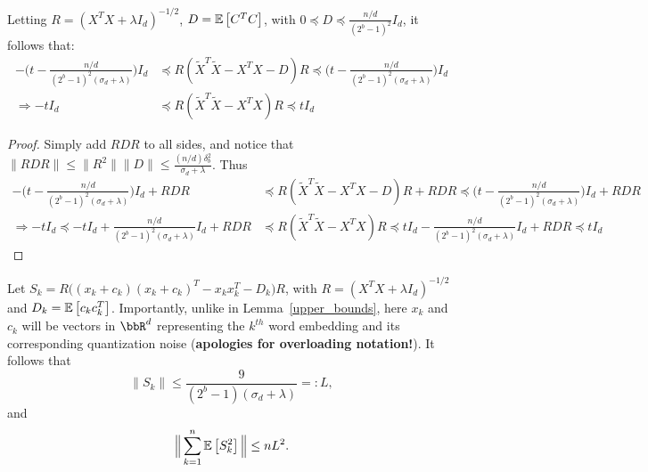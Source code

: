 \documentclass[12pt]{article}
\newcommand{\tX}{\tilde{X}}
\newcommand{\eqdef}{=:}
\begin{document}
	
\begin{lemma}
	\label{lem2}
	Letting $R = (X^T X + \lambda I_d)^{-1/2}$, $D = \expect{}{C^T C}$, with $0 \preceq D \preceq \frac{n/d}{(2^b-1)^2} I_d$, it follows that:
	\begin{align*}
	-\bigg(t - \frac{n/d}{(2^b-1)^2(\sigma_d + \lambda)}\bigg) I_d &\preceq R (\tX^T \tX - X^T X - D) R \preceq
	\bigg(t - \frac{n/d}{(2^b-1)^2(\sigma_d + \lambda)}\bigg) I_d \\
	\Longrightarrow -t I_d &\preceq R (\tX^T \tX - X^T X) R \preceq t I_d
	\end{align*}
\end{lemma}
\begin{proof}
	Simply add $RDR$ to all sides, and notice that $\|RDR\| \leq \|R^2\|\|D\| \leq  \frac{(n/d)\delta_b^2}{\sigma_d+\lambda}$. Thus
	\begin{align*}
-\bigg(t - \frac{n/d}{(2^b-1)^2(\sigma_d + \lambda)}\bigg) I_d + RDR &\preceq R (\tX^T \tX - X^T X - D) R + RDR \preceq
\bigg(t - \frac{n/d}{(2^b-1)^2(\sigma_d + \lambda)}\bigg) I_d +RDR \\
\Longrightarrow -t I_d \preceq -t I_d + \frac{n/d}{(2^b-1)^2(\sigma_d + \lambda)}I_d + RDR &\preceq R (\tX^T \tX - X^T X) R \preceq
t I_d - \frac{n/d}{(2^b-1)^2(\sigma_d + \lambda)} I_d + RDR \preceq t I_d
\end{align*}
\end{proof}
\begin{lemma}
	\label{upper_bounds2}
	Let $S_k = R\Big((x_k + c_k)(x_k + c_k)^T  - x_k x_k^T - D_k\Big)R$, with $R=(X^T X+\lambda I_d)^{-1/2}$ and $D_k = \expect{}{c_kc_k^T}$. Importantly, unlike in Lemma~\ref{upper_bounds}, here $x_k$ and $c_k$ will be vectors in $\RR^d$ representing the $k^{th}$ word embedding and its corresponding quantization noise (\textbf{apologies for overloading notation!}).  
	It follows that
		$$\|S_k\| \leq \frac{9}{(2^b-1)(\sigma_d + \lambda)} \eqdef L,$$
		and
		$$\Big\|\sum_{k=1}^n \expect{}{S_k^2}\Big\| \leq nL^2.$$
	\end{lemma}
\end{document}

